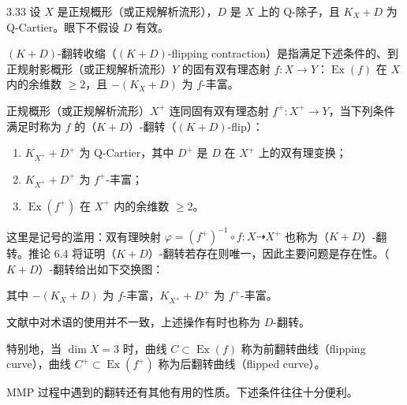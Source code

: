 \begin{definition}{3.33}
设 $X$ 是正规概形（或正规解析流形），$D$ 是 $X$ 上的 Q-除子，且 $K_X+D$ 为 Q-Cartier。眼下不假设 $D$ 有效。

$(K+D)$-翻转收缩（$(K+D)$-flipping contraction）是指满足下述条件的、到正规射影概形（或正规解析流形）$Y$ 的固有双有理态射 $f:X\to Y$：$\operatorname{Ex}(f)$ 在 $X$ 内的余维数 $\ge 2$，且 $-(K_X+D)$ 为 $f$-丰富。

正规概形（或正规解析流形）$X^{+}$ 连同固有双有理态射 $f^{+}:X^{+}\to Y$，当下列条件满足时称为 $f$ 的（$K+D$）-翻转（$(K+D)$-flip）：
\begin{enumerate}[label=(\arabic*)]
\item $K_{X^{+}}+D^{+}$ 为 Q-Cartier，其中 $D^{+}$ 是 $D$ 在 $X^{+}$ 上的双有理变换；
\item $K_{X^{+}}+D^{+}$ 为 $f^{+}$-丰富；
\item $\operatorname{Ex}(f^{+})$ 在 $X^{+}$ 内的余维数 $\ge 2$。
\end{enumerate}
这里是记号的滥用：双有理映射 $\varphi=(f^{+})^{-1}\circ f:X\dashrightarrow X^{+}$ 也称为（$K+D$）-翻转。推论 6.4 将证明（$K+D$）-翻转若存在则唯一，因此主要问题是存在性。（$K+D$）-翻转给出如下交换图：

\begin{center}
\end{center}

其中 $-(K_X+D)$ 为 $f$-丰富，$K_{X^{+}}+D^{+}$ 为 $f^{+}$-丰富。

文献中对术语的使用并不一致，上述操作有时也称为 $D$-翻转。

特别地，当 $\dim X=3$ 时，曲线 $C\subset\operatorname{Ex}(f)$ 称为前翻转曲线（flipping curve），曲线 $C^{+}\subset\operatorname{Ex}(f^{+})$ 称为后翻转曲线（flipped curve）。
\end{definition}

MMP 过程中遇到的翻转还有其他有用的性质。下述条件往往十分便利。

